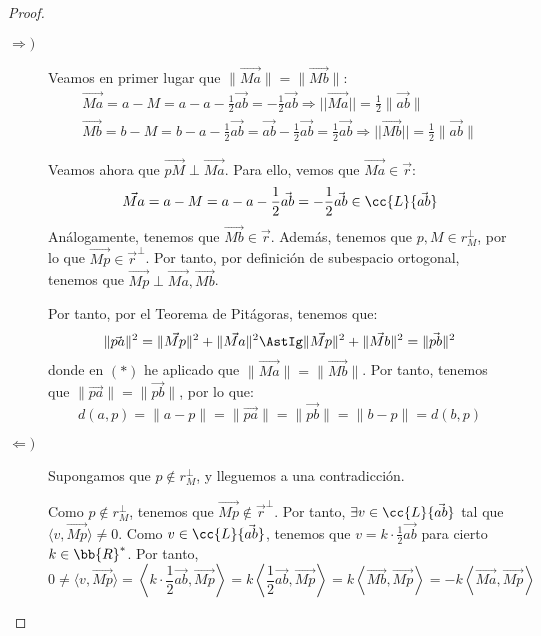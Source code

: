 \begin{proof}\
    \begin{description}
        \item[$\Longrightarrow)$] Veamos en primer lugar que $\|\vec{Ma}\|=\|\vec{Mb}\|$:
        \begin{gather*}
            \vec{Ma} = a-M=a-a-\frac{1}{2}\vec{ab} = -\frac{1}{2}\vec{ab} \Longrightarrow ||\vec{Ma}|| = \frac{1}{2}\|\vec{ab}\|\\
            \vec{Mb} = b-M=b-a-\frac{1}{2}\vec{ab} = \vec{ab}-\frac{1}{2}\vec{ab} = \frac{1}{2}\vec{ab} \Longrightarrow ||\vec{Mb}|| = \frac{1}{2}\|\vec{ab}\|
        \end{gather*}
        
        
        Veamos ahora que $\vec{pM}\perp \vec{Ma}$. Para ello, vemos que $\vec{Ma}\in \vec{r}$:
        \begin{equation*}
            \vec{Ma}=a-M=a-a-\frac{1}{2}\vec{ab}=-\frac{1}{2}\vec{ab}\in \cc{L}\{\vec{ab}\}
        \end{equation*}
        Análogamente, tenemos que $\vec{Mb}\in \vec{r}$. Además, tenemos que $p,M\in r_M^\perp$, por lo que $\vec{Mp}\in \vec{r}^\perp$. Por tanto, por definición de subespacio ortogonal, tenemos que $\vec{Mp}\perp \vec{Ma},\vec{Mb}$.

        Por tanto, por el Teorema de Pitágoras, tenemos que:
        \begin{equation*}
            \|\vec{pa}\|^2 = \|\vec{Mp}\|^2 + \|\vec{Ma}\|^2 \AstIg \|\vec{Mp}\|^2 + \|\vec{Mb}\|^2 = \|\vec{pb}\|^2
        \end{equation*}
        donde en $(\ast)$ he aplicado que $\|\vec{Ma}\|=\|\vec{Mb}\|$. Por tanto, tenemos que $\|\vec{pa}\|=\|\vec{pb}\|$, por lo que:
        \begin{equation*}
            d(a,p)=\|a-p\| = \|\vec{pa}\|=\|\vec{pb}\| = \|b-p\| = d(b,p)
        \end{equation*}
        
        \item[$\Longleftarrow)$] Supongamos que $p\notin r_M^\perp$, y lleguemos a una contradicción.
        
        Como $p\notin r_M^\perp$, tenemos que $\vec{Mp}\notin \vec{r}^\perp$. Por tanto, $\exists v\in \cc{L}\{\vec{ab}\}$ tal que $\langle v,\vec{Mp}\rangle\neq 0$. Como $v\in \cc{L}\{\vec{ab}\}$, tenemos que $v=k\cdot \frac{1}{2}\vec{ab}$ para cierto $k\in \bb{R}^\ast$. Por tanto,
        \begin{equation*}
            0\neq \langle v,\vec{Mp}\rangle = \left\langle k\cdot \frac{1}{2}\vec{ab},\vec{Mp}\right\rangle
            = k \left\langle \frac{1}{2}\vec{ab},\vec{Mp}\right\rangle
            = k \left\langle \vec{Mb},\vec{Mp}\right\rangle
            = -k \left\langle \vec{Ma},\vec{Mp}\right\rangle
        \end{equation*}


\end{description}
\end{proof}
